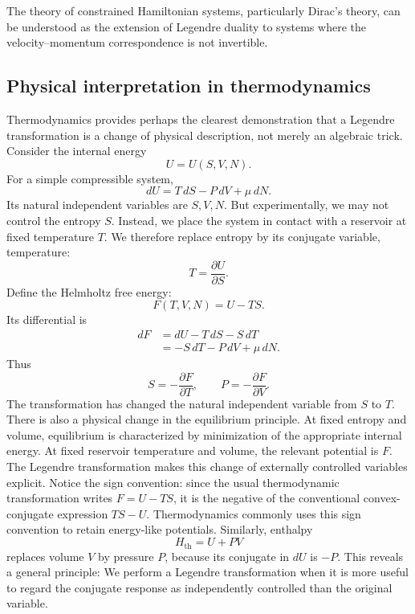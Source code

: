 The theory of constrained Hamiltonian systems, particularly Dirac's theory, can
be understood as the extension of Legendre duality to systems where the
velocity–momentum correspondence is not invertible.

\subsection{ Physical interpretation in thermodynamics}
Thermodynamics provides perhaps the clearest demonstration that a Legendre
transformation is a change of physical description, not merely an algebraic
trick.
Consider the internal energy
\[
U=U(S,V,N).
\]
For a simple compressible system,
\[
dU=T\,dS-P\,dV+\mu\,dN.
\]
Its natural independent variables are \(S,V,N\).
But experimentally, we may not control the entropy \(S\). Instead, we place the
system in contact with a reservoir at fixed temperature \(T\).
We therefore replace entropy by its conjugate variable, temperature:
\[
T=\frac{\partial U}{\partial S}.
\]
Define the Helmholtz free energy:
\[
\boxed{F(T,V,N)=U-TS.}
\]
Its differential is
\[
\begin{aligned}
dF
&=dU-T\,dS-S\,dT\\
&=-S\,dT-P\,dV+\mu\,dN.
\end{aligned}
\]
Thus
\[
\boxed{
S=-\frac{\partial F}{\partial T},
\qquad
P=-\frac{\partial F}{\partial V}.
}
\]
The transformation has changed the natural independent variable from \(S\) to
\(T\).
There is also a physical change in the equilibrium principle. At fixed entropy
and volume, equilibrium is characterized by minimization of the appropriate
internal energy. At fixed reservoir temperature and volume, the relevant
potential is \(F\).
The Legendre transformation makes this change of externally controlled
variables explicit.
Notice the sign convention: since the usual thermodynamic transformation writes
\(F=U-TS\), it is the negative of the conventional convex-conjugate expression
\(TS-U\). Thermodynamics commonly uses this sign convention to retain
energy-like potentials.
Similarly, enthalpy
\[
H_{\mathrm{th}}=U+PV
\]
replaces volume \(V\) by pressure \(P\), because its conjugate in \(dU\) is
\(-P\).
This reveals a general principle:
We perform a Legendre transformation when it is more useful to regard the
conjugate response as independently controlled than the original variable.

